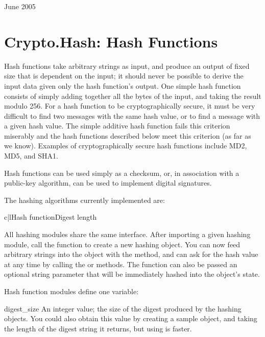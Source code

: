 \documentclass{howto}
\begin{document}
June 2005


\section{Crypto.Hash: Hash Functions}

Hash functions take arbitrary strings as input, and produce an output
of fixed size that is dependent on the input; it should never be
possible to derive the input data given only the hash function's
output.  One simple hash function consists of simply adding together
all the bytes of the input, and taking the result modulo 256.  For a
hash function to be cryptographically secure, it must be very
difficult to find two messages with the same hash value, or to find a
message with a given hash value.  The simple additive hash function
fails this criterion miserably and the hash functions described below
meet this criterion (as far as we know).  Examples of
cryptographically secure hash functions include MD2, MD5, and SHA1.

Hash functions can be used simply as a checksum, or, in association with a
public-key algorithm, can be used to implement digital signatures.
 
The hashing algorithms currently implemented are:

\begin{tableii}{c|l}{}{Hash function}{Digest length}
\end{tableii}

All hashing modules share the same interface.  After importing a given
hashing module, call the  function to create a new
hashing object. You can now feed arbitrary strings into the object
with the  method, and can ask for the hash value at
any time by calling the  or 
methods.  The  function can also be passed an optional
string parameter that will be immediately hashed into the object's
state.

Hash function modules define one variable:

\begin{datadesc}{digest_size}
An integer value; the size of the digest
produced by the hashing objects.  You could also obtain this value by
creating a sample object, and taking the length of the digest string
it returns, but using  is faster.
\end{datadesc}
\end{document}
